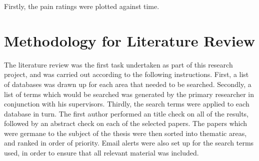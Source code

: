 Firstly, the pain ratings were plotted against time. 



\section{Methodology for Literature Review}

The literature review was the first task undertaken as part of this research project, and was carried out according to the following instructions. First, a list of databases was drawn up for each area that needed to be searched. Secondly, a list of terms which would be searched was generated by the primary researcher in conjunction with his supervisors. Thirdly, the search terms were applied to each database in turn. The first author performed an title check on all of the results, followed by an abstract check on each of the selected papers. The papers which were germane to the subject of the thesis were then sorted into thematic areas, and ranked in order of priority. Email alerts were also set up for the search terms used, in order to ensure that all relevant material was included. 


